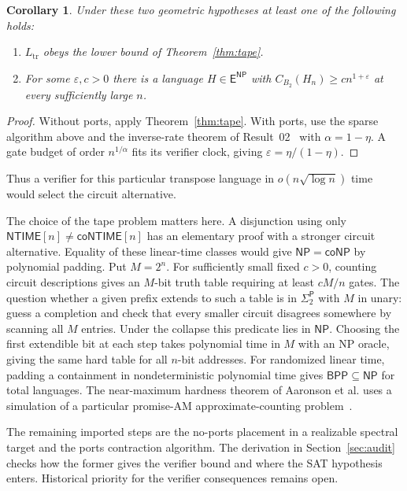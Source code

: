 \documentclass[11pt]{article}
\newtheorem{corollary}[theorem]{Corollary}
\newcommand{\TrLang}{L_{\mathrm{tr}}}
\newcommand{\NT}{\mathsf{NTIME}}
\newcommand{\coNT}{\mathsf{coNTIME}}
\newcommand{\ENP}{\mathsf E^{\mathsf{NP}}}
\begin{document}
\begin{corollary}
Under these two geometric hypotheses at least one of the following holds:
\begin{enumerate}
\item $\TrLang$ obeys the lower bound of Theorem~\ref{thm:tape}.
\item For some $\varepsilon,c>0$ there is a language $H\in\ENP$ with
      $C_{B_2}(H_n)\ge cn^{1+\varepsilon}$ at every sufficiently large $n$.
\end{enumerate}
\end{corollary}
\begin{proof}
Without ports, apply Theorem~\ref{thm:tape}. With ports, use the sparse
algorithm above and the inverse-rate theorem of Result~02~\cite{inverse}
with $\alpha=1-\eta$. A gate budget of order $n^{1/\alpha}$ fits its
verifier clock, giving $\varepsilon=\eta/(1-\eta)$.
\end{proof}
Thus a verifier for this particular transpose language in
$o(n\sqrt{\log n})$ time would select the circuit alternative.

The choice of the tape problem matters here. A disjunction using only
$\NT[n]\ne\coNT[n]$ has an elementary proof with a stronger circuit
alternative. Equality of these linear-time classes would give
$\mathsf{NP}=\mathsf{coNP}$ by polynomial padding. Put $M=2^n$.
For sufficiently small fixed $c>0$, counting circuit descriptions gives
an $M$-bit truth table requiring at least $cM/n$ gates. The question
whether a given prefix extends to such a table is in $\Sigma_2^{\mathsf P}$
with $M$ in unary: guess a completion and check that every smaller
circuit disagrees somewhere by scanning all $M$ entries. Under the
collapse this predicate lies in $\mathsf{NP}$. Choosing the first
extendible bit at each step takes polynomial time in $M$ with an NP
oracle, giving the same hard table for all $n$-bit addresses.
For randomized linear time, padding a containment in nondeterministic
polynomial time gives $\mathsf{BPP}\subseteq\mathsf{NP}$ for total languages.
The near-maximum hardness theorem of Aaronson et al. uses a simulation
of a particular promise-AM approximate-counting problem~\cite{promise}.

The remaining imported steps are the no-ports placement in a realizable
spectral target and the ports contraction algorithm. The derivation in
Section~\ref{sec:audit} checks how the former gives the verifier bound
and where the SAT hypothesis enters. Historical priority for the
verifier consequences remains open.
\end{document}
